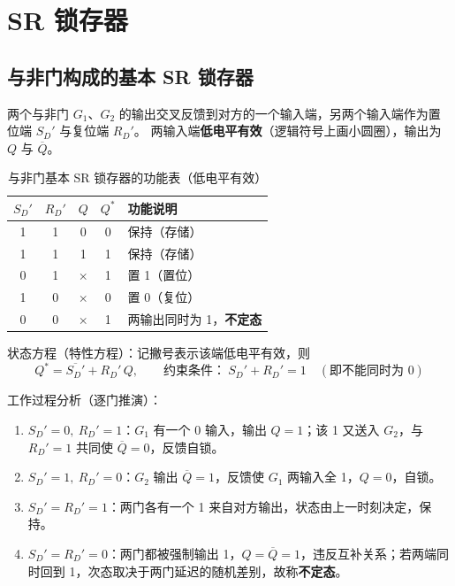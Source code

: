 \section{SR 锁存器}
\subsection{与非门构成的基本 SR 锁存器}
两个与非门 $G_1$、$G_2$ 的输出交叉反馈到对方的一个输入端，另两个输入端作为置位端 $S_D'$ 与复位端 $R_D'$。
两输入端\textbf{低电平有效}（逻辑符号上画小圆圈），输出为 $Q$ 与 $\overline{Q}$。

\begin{table}[!htbp]
\centering
\caption{与非门基本 SR 锁存器的功能表（低电平有效）}
\begin{tabular}{cc|cc|l}
\toprule
$S_D'$ & $R_D'$ & $Q$ & $Q^*$ & 功能说明 \\
\midrule
1 & 1 & 0 & 0 & 保持（存储） \\
1 & 1 & 1 & 1 & 保持（存储） \\
0 & 1 & $\times$ & 1 & 置 1（置位） \\
1 & 0 & $\times$ & 0 & 置 0（复位） \\
0 & 0 & $\times$ & 1 & 两输出同时为 1，\textbf{不定态} \\
\bottomrule
\end{tabular}
\end{table}

\noindent 状态方程（特性方程）：记撇号表示该端低电平有效，则
\begin{equation}
Q^* = \overline{S_D'} + R_D'\,Q,
\qquad
\text{约束条件：}\ S_D' + R_D' = 1
\quad(\text{即不能同时为 }0)
\label{eq:sr_nand}
\end{equation}

\noindent 工作过程分析（逐门推演）：
\begin{enumerate}
    \item $S_D'=0,\ R_D'=1$：$G_1$ 有一个 0 输入，输出 $Q=1$；该 1 又送入 $G_2$，与 $R_D'=1$ 共同使 $\overline{Q}=0$，反馈自锁。
    \item $S_D'=1,\ R_D'=0$：$G_2$ 输出 $\overline{Q}=1$，反馈使 $G_1$ 两输入全 1，$Q=0$，自锁。
    \item $S_D'=R_D'=1$：两门各有一个 1 来自对方输出，状态由上一时刻决定，保持。
    \item $S_D'=R_D'=0$：两门都被强制输出 1，$Q=\overline{Q}=1$，违反互补关系；若两端同时回到 1，次态取决于两门延迟的随机差别，故称\textbf{不定态}。
\end{enumerate}

